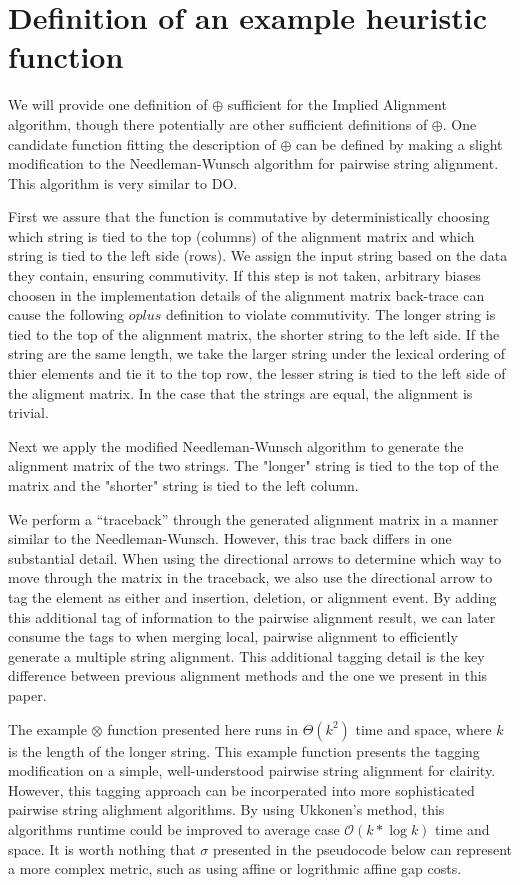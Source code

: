 \documentclass[11pt]{article}
\begin{document}
\section{Definition of an example heuristic function}
We will provide one definition of $\oplus$ sufficient for the Implied Alignment algorithm, though there potentially are other sufficient definitions of $\oplus$. 
One candidate function fitting the description of $\oplus$ can be defined by making a slight modification to the Needleman-Wunsch \cite{Needleman1970} algorithm for pairwise string alignment.
 This algorithm is very similar to DO.

First we assure that the function is commutative by deterministically choosing which string is tied to the top (columns) of the alignment matrix and which string is tied to the left side (rows). 
We assign the input string based on the data they contain, ensuring commutivity. If this step is not taken, arbitrary biases choosen in the implementation details of the alignment matrix back-trace can cause the following $oplus$ definition to violate commutivity. 
The longer string is tied to the top of the alignment matrix, the shorter string to the left side. If the string are the same length, we take the larger string under the lexical ordering of thier elements and tie it to the top row, the lesser string is tied to the left side of the aligment matrix. 
In the case that the strings are equal, the alignment is trivial.

Next we apply the modified Needleman-Wunsch algorithm to generate the alignment matrix of the two strings. The "longer" string is tied to the top of the matrix and the "shorter" string is tied to the left column.

We perform a ``traceback'' through the generated alignment matrix in a manner similar to the  Needleman-Wunsch. 
However, this trac back differs in one substantial detail. When using the directional arrows to determine which way to move through the matrix in the traceback, we also use the directional arrow to tag the element as either and insertion, deletion, or alignment event. 
By adding this additional tag of information to the pairwise alignment result, we can later consume the tags to when merging local, pairwise alignment to efficiently generate a multiple string alignment.
This additional tagging detail is the key difference between previous alignment methods and the one we present in this paper.

The example $\otimes$ function presented here runs in $\Theta\left( k^2 \right)$ time and space, where $k$ is the length of the longer string. This example function presents the tagging modification on a simple, well-understood pairwise string alignment for clairity. However, this tagging approach can be incorperated into more sophisticated pairwise string alighment algorithms. By using Ukkonen's method, this algorithms runtime could be improved to average case $\mathcal{O}\left( k * \log k \right)$ time and space. It is worth nothing that $\sigma$ presented in the pseudocode below can represent a more complex metric, such as using affine or logrithmic affine gap costs.
\end{document}
